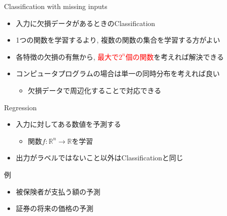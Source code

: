 \documentclass[dvipdfmx, 10pt]{beamer}
\newcommand{\red}[1]{\textcolor{red}{#1}}
\newcommand{\green}[1]{\textcolor{green!40!black}{#1}}
\begin{document}

\begin{frame}{Classification with missing inputs}
  \begin{itemize}
    \item 入力に欠損データがあるときのClassification
    \item 1つの関数を学習するより, 複数の関数の集合を学習する方がよい
    \item 各特徴の欠損の有無から, \red{最大で$2 ^ {n}$個の関数}を考えれば解決できる
    \item コンピュータプログラムの場合は単一の同時分布を考えれば良い
      \begin{itemize}
        \item 欠損データで周辺化することで対応できる
      \end{itemize}
  \end{itemize}
\end{frame}


\begin{frame}{Regression}
  \begin{itemize}
    \item 入力に対してある数値を予測する
    \begin{itemize}
      \item 関数$f: \mathbb{R} ^ {n} \to \mathbb{R}$を学習
    \end{itemize}
    \item 出力がラベルではないこと以外はClassificationと同じ
  \end{itemize}
  \begin{exampleblock}{例}
    \begin{itemize}
      \item 被保険者が支払う額の予測
      \item 証券の将来の価格の予測
    \end{itemize}
  \end{exampleblock}
\end{frame}

\end{document}
